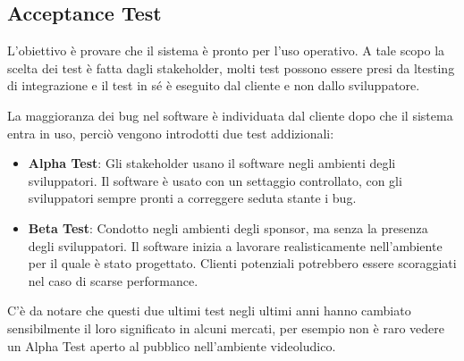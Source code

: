         \subsection{Acceptance Test}
            L'obiettivo è provare che il sistema è pronto per l'uso operativo. A tale scopo la scelta dei test è fatta dagli stakeholder, molti test possono essere presi da ltesting di integrazione e il test in sé è eseguito dal cliente e non dallo sviluppatore.
            
            La maggioranza dei bug nel software è individuata dal cliente dopo che il sistema entra in uso, perciò vengono introdotti due test addizionali:
            \begin{itemize}
                \item \textbf{Alpha Test}: Gli stakeholder usano il software negli ambienti degli sviluppatori. Il software è usato con un settaggio controllato, con gli sviluppatori sempre pronti a correggere seduta stante i bug.
                \item \textbf{Beta Test}: Condotto negli ambienti degli sponsor, ma senza la presenza degli sviluppatori. Il software inizia a lavorare realisticamente nell'ambiente per il quale è stato progettato. Clienti potenziali potrebbero essere scoraggiati nel caso di scarse performance.
            \end{itemize}
            
            C'è da notare che questi due ultimi test negli ultimi anni hanno cambiato sensibilmente il loro significato in alcuni mercati, per esempio non è raro vedere un Alpha Test aperto al pubblico nell'ambiente videoludico.